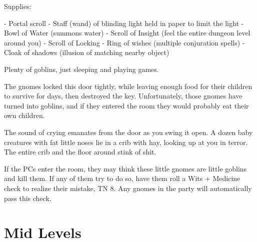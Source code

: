 \begin{multicols}{2}
Supplies:

- Portal scroll
- Staff (wand) of blinding light held in paper to limit the light
- Bowl of Water (summons water)
- Scroll of Insight (feel the entire dungeon level around you)
- Scroll of Locking
- Ring of wishes (multiple conjuration spells)
- Cloak of shadows (illusion of matching nearby object)

\goblinnuramancer

\goblin


Plenty of goblins, just sleeping and playing games.

\goblin


\begin{exampletext}

	The gnomes locked this door tightly, while leaving enough food for their children to survive for days, then destroyed the key.
	Unfortunately, those gnomes have turned into goblins, and if they entered the room they would probably eat their own children.

\end{exampletext}

\begin{boxtext}

	The sound of crying emanates from the door as you swing it open.
	A dozen baby creatures with fat little noses lie in a crib with hay, looking up at you in terror.
	The entire crib and the floor around stink of shit.

\end{boxtext}

If the PCs enter the room, they may think these little gnomes are little goblins and kill them.
If any of them try to do so, have them roll a Wits + Medicine check to realize their mistake, TN 8.
Any gnomes in the party will automatically pass this check.

\end{multicols}


\label{laddertop}

\section{Mid Levels}

